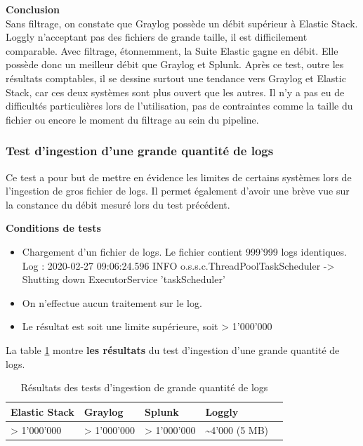 \documentclass[paper=a4, fontsize=11pt]{scrartcl}
\begin{document}
\textbf{Conclusion} \\
Sans filtrage, on constate que Graylog possède un débit supérieur à Elastic Stack. Loggly n'acceptant pas des fichiers de grande taille, il est difficilement comparable. Avec filtrage, étonnemment, la Suite Elastic gagne en débit. Elle possède donc un meilleur débit que Graylog et Splunk.
Après ce test, outre les résultats comptables, il se dessine surtout une tendance vers Graylog et Elastic Stack, car ces deux systèmes sont plus \og ouvert \fg que les autres. Il n'y a pas eu de difficultés particulières lors de l'utilisation, pas de contraintes comme la taille du fichier ou encore le moment du filtrage au sein du pipeline.

\subsubsection{Test d'ingestion d'une grande quantité de logs}

Ce test a pour but de mettre en évidence les limites de certains systèmes lors de l'ingestion de gros fichier de logs. Il permet également d'avoir une brève vue sur la constance du débit mesuré lors du test précédent.

\textbf{Conditions de tests} \\
\begin{itemize}
    \item Chargement d'un fichier de logs.
    \subitem Le fichier contient 999'999 logs identiques.
    \subitem Log : 2020-02-27 09:06:24.596 INFO o.s.s.c.ThreadPoolTaskScheduler -> Shutting down ExecutorService ’taskScheduler’
    \item On n'effectue aucun traitement sur le log.
    \item Le résultat est soit une limite supérieure, soit \og > 1'000'000 \fg
\end{itemize}

La table \ref{t-testGrandeIngestion} montre \textbf{les résultats} du test d'ingestion d'une grande quantité de logs.

\centering
\begin{table}[H]
\centering
\begin{tabular}{ |p{3cm}|p{3cm}|p{3cm}|p{3cm}|p{3cm}|  }
    \hline
    Elastic Stack & Graylog & Splunk & Loggly \\
    \hline
    > 1'000'000 & > 1'000'000 & > 1'000'000 & \textasciitilde 4'000 (5 MB) \\
    \hline
\end{tabular}
\caption{Résultats des tests d'ingestion de grande quantité de logs}
\label{t-testGrandeIngestion}
\end{table}
\justify
\end{document}
